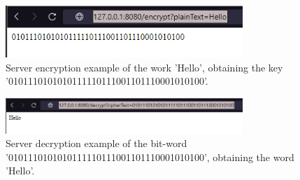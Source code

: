 \documentclass[letterpaper,12pt]{article}
\begin{document}
\begin{figure}
    \centering
    \includegraphics[width=0.8\textwidth]{assets/ServerCrypt.png}
    \caption{Server encryption example of the work 'Hello', obtaining the key '0101110101010111110111001101110001010100'. }
    \label{fig:my_label}
\end{figure}


\begin{figure}
    \centering
    \includegraphics[width=0.8\textwidth]{assets/ServerDecrypt.png}
    \caption{Server decryption example of the bit-word '0101110101010111110111001101110001010100', obtaining the word 'Hello'. }
    \label{fig:my_label}
\end{figure}

\newpage
\end{document}
